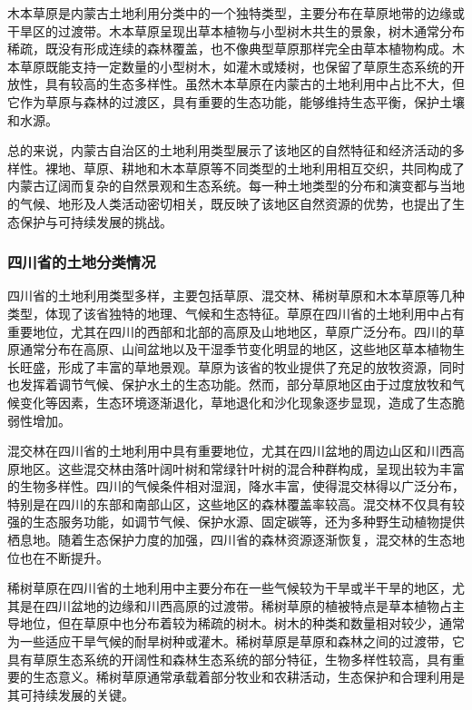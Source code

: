 \documentclass{article}
\begin{document}
		木本草原是内蒙古土地利用分类中的一个独特类型，主要分布在草原地带的边缘或干旱区的过渡带。木本草原呈现出草本植物与小型树木共生的景象，树木通常分布稀疏，既没有形成连续的森林覆盖，也不像典型草原那样完全由草本植物构成。木本草原既能支持一定数量的小型树木，如灌木或矮树，也保留了草原生态系统的开放性，具有较高的生态多样性。虽然木本草原在内蒙古的土地利用中占比不大，但它作为草原与森林的过渡区，具有重要的生态功能，能够维持生态平衡，保护土壤和水源。
		
		总的来说，内蒙古自治区的土地利用类型展示了该地区的自然特征和经济活动的多样性。裸地、草原、耕地和木本草原等不同类型的土地利用相互交织，共同构成了内蒙古辽阔而复杂的自然景观和生态系统。每一种土地类型的分布和演变都与当地的气候、地形及人类活动密切相关，既反映了该地区自然资源的优势，也提出了生态保护与可持续发展的挑战。
		
		
		\subsubsection{四川省的土地分类情况}
		
		
		四川省的土地利用类型多样，主要包括草原、混交林、稀树草原和木本草原等几种类型，体现了该省独特的地理、气候和生态特征。草原在四川省的土地利用中占有重要地位，尤其在四川的西部和北部的高原及山地地区，草原广泛分布。四川的草原通常分布在高原、山间盆地以及干湿季节变化明显的地区，这些地区草本植物生长旺盛，形成了丰富的草地景观。草原为该省的牧业提供了充足的放牧资源，同时也发挥着调节气候、保护水土的生态功能。然而，部分草原地区由于过度放牧和气候变化等因素，生态环境逐渐退化，草地退化和沙化现象逐步显现，造成了生态脆弱性增加。
		
		混交林在四川省的土地利用中具有重要地位，尤其在四川盆地的周边山区和川西高原地区。这些混交林由落叶阔叶树和常绿针叶树的混合种群构成，呈现出较为丰富的生物多样性。四川的气候条件相对湿润，降水丰富，使得混交林得以广泛分布，特别是在四川的东部和南部山区，这些地区的森林覆盖率较高。混交林不仅具有较强的生态服务功能，如调节气候、保护水源、固定碳等，还为多种野生动植物提供栖息地。随着生态保护力度的加强，四川省的森林资源逐渐恢复，混交林的生态地位也在不断提升。
		
		稀树草原在四川省的土地利用中主要分布在一些气候较为干旱或半干旱的地区，尤其是在四川盆地的边缘和川西高原的过渡带。稀树草原的植被特点是草本植物占主导地位，但在草原中也分布着较为稀疏的树木。树木的种类和数量相对较少，通常为一些适应干旱气候的耐旱树种或灌木。稀树草原是草原和森林之间的过渡带，它具有草原生态系统的开阔性和森林生态系统的部分特征，生物多样性较高，具有重要的生态意义。稀树草原通常承载着部分牧业和农耕活动，生态保护和合理利用是其可持续发展的关键。
		
\end{document}
